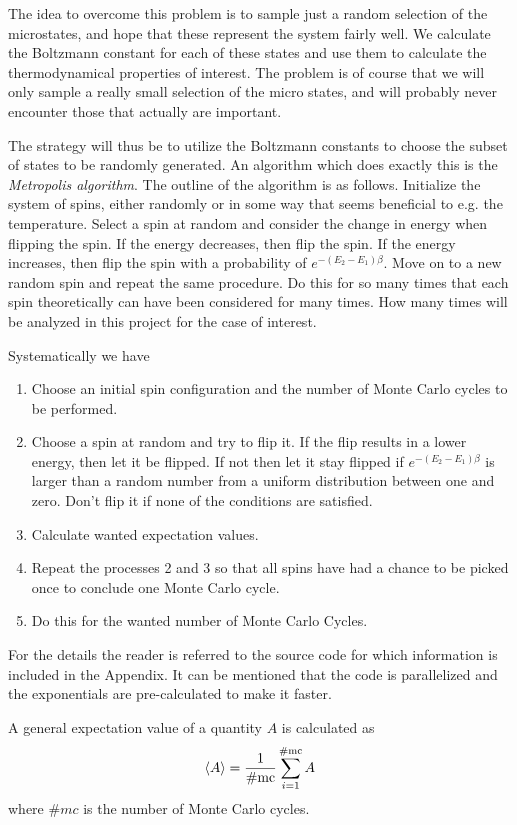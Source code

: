 \documentclass[11pt, a4paper]{article}
\begin{document}
The idea to overcome this problem is to sample just a random selection of the microstates, and hope that these represent the system fairly well. We calculate the Boltzmann constant for each of these states and use them to calculate the thermodynamical properties of interest. The problem is of course that we will only sample a really small selection of the micro states, and will probably never encounter those that actually are important. 

The strategy will thus be to utilize the Boltzmann constants to choose the subset of states to be randomly generated. An algorithm which does exactly this is the \textit{Metropolis algorithm}. The outline of the algorithm is as follows. Initialize the system of spins, either randomly or in some way that seems beneficial to e.g. the temperature. Select a spin at random and consider the change in energy when flipping the spin. If the energy decreases, then flip the spin. If the energy increases, then flip the spin with a probability of $e^{-(E_2-E_1)\beta}$. Move on to a new random spin and repeat the same procedure. Do this for so many times that each spin theoretically can have been considered for many times. How many times will be analyzed in this project for the case of interest.

Systematically we have
\begin{enumerate}
\item Choose an initial spin configuration and the number of Monte Carlo cycles to be performed.
\item Choose a spin at random and try to flip it. If the flip results in a lower energy, then let it be flipped. If not then let it stay flipped if $e^{-(E_2-E_1)\beta}$ is larger than a random number from a uniform distribution between one and zero. Don't flip it if none of the conditions are satisfied.
\item Calculate wanted expectation values.
\item Repeat the processes 2 and 3 so that all spins have had a chance to be picked once to conclude one Monte Carlo cycle.
\item Do this for the wanted number of Monte Carlo Cycles.
\end{enumerate}

For the details the reader is referred to the source code for which information is included in the Appendix. It can be mentioned that the code is parallelized and the exponentials are pre-calculated to make it faster.

A general expectation value of a quantity $A$ is calculated as
\begin{gather}
\braket{A} = \frac{1}{\#\text{mc}}\sum\limits_{i=1}^{\#\text{mc}} A 
\end{gather} 
where $\# mc$ is the number of Monte Carlo cycles.
\end{document}
